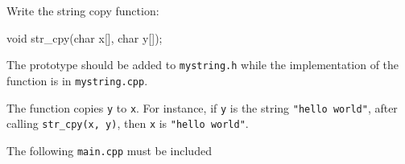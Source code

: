 Write the string copy function:
\begin{console}
void str_cpy(char x[], char y[]);
\end{console}
The prototype should be added to \verb!mystring.h!
while the implementation of the function is in \verb!mystring.cpp!.

The function copies \verb!y! to \verb!x!.
For instance, if \verb!y! is the string \verb!"hello world"!,
after calling \verb!str_cpy(x, y)!, then \verb!x! is \verb!"hello world"!.

The following \verb!main.cpp! must be included

